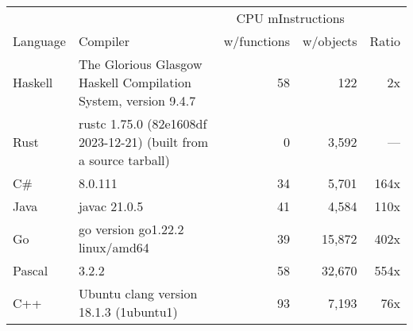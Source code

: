 \documentclass{article}
\begin{document}
      \begin{tabularx}{\linewidth}{lXrrr}
      \toprule
        & & \multicolumn{2}{c}{CPU mInstructions} & \\
        Language & Compiler & w/functions & w/objects & Ratio \\
      \midrule
    Haskell & The Glorious Glasgow Haskell Compilation System, version 9.4.7 & 58 & 122 & 2x \\
Rust & rustc 1.75.0 (82e1608df 2023-12-21) (built from a source tarball) & 0 & 3,592 & --- \\
C\# & 8.0.111 & 34 & 5,701 & 164x \\
Java & javac 21.0.5 & 41 & 4,584 & 110x \\
Go & go version go1.22.2 linux/amd64 & 39 & 15,872 & 402x \\
Pascal & 3.2.2 & 58 & 32,670 & 554x \\
C++ & Ubuntu clang version 18.1.3 (1ubuntu1) & 93 & 7,193 & 76x \\

      \bottomrule
      \end{tabularx}
      
\end{document}
